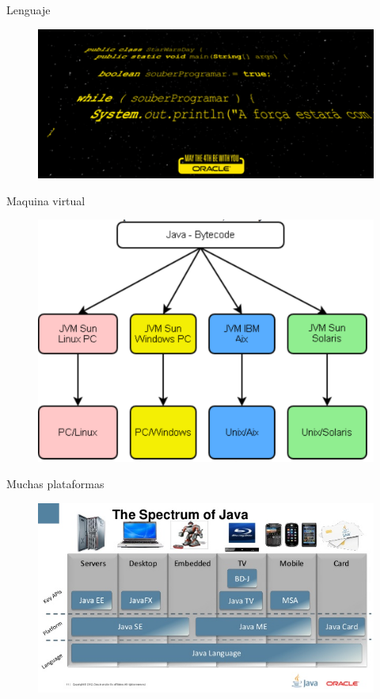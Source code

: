 \documentclass{beamer}
\begin{document}
\begin{frame}{Lenguaje}
	\begin{figure}
		\centering
		\includegraphics[width=0.9\linewidth]{Images/javalang}
	\end{figure}
\end{frame}

\begin{frame}{Maquina virtual}
	\begin{figure}
		\centering
		\includegraphics[width=0.9\linewidth]{Images/jvm}
	\end{figure}
\end{frame}

\begin{frame}{Muchas plataformas}
	\begin{figure}
		\centering
		\includegraphics[width=0.9\linewidth]{Images/spectrum}
	\end{figure}
\end{frame}
\iffalse
\end{document}
